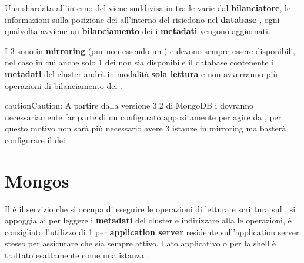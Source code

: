 \documentclass[a4paper,10pt,english]{sphinxmanual}
\begin{document}
Una  shardata all'interno del {\hyperref[cluster_architecture/architecture:cluster]{\emph{}}} viene suddivisa in  tra le
varie {\hyperref[cluster_architecture/architecture:shard]{\emph{}}} dal \textbf{bilanciatore}, le informazioni sulla posizione dei 
all'interno del {\hyperref[cluster_architecture/architecture:cluster]{\emph{}}} risiedono nel \textbf{database} , ogni qualvolta avviene un
\textbf{bilanciamento} dei  i \textbf{metadati} vengono aggiornati.

I 3  sono in \textbf{mirroring} (pur non essendo un {\hyperref[cluster_architecture/architecture:replica-set]{\emph{}}}) e devono
sempre essere disponibili, nel caso in cui anche solo 1 dei  non sia disponibile
il database contenente i \textbf{metadati} del cluster andrà in modalità \textbf{sola lettura} e non
avverranno più operazioni di bilanciamento dei .

\begin{notice}{caution}{Caution:}
A partire dalla versione 3.2 di MongoDB i  dovranno necessariamente far parte
di un {\hyperref[cluster_architecture/architecture:replica-set]{\emph{}}} configurato appositamente per agire da , per questo
motivo non sarà più necessario avere 3 istanze  in mirroring ma basterà configurare
il {\hyperref[cluster_architecture/architecture:replica-set]{\emph{}}} dei .
\end{notice}


\section{Mongos}
\label{cluster_architecture/architecture:id5}\label{cluster_architecture/architecture:mongos}
Il  è il servizio che si occupa di eseguire le operazioni di lettura e scrittura sul
{\hyperref[cluster_architecture/architecture:cluster]{\emph{}}}, si appoggia ai {\hyperref[cluster_architecture/architecture:config-server]{\emph{}}} per leggere i \textbf{metadati} del cluster e
indirizzare alla {\hyperref[cluster_architecture/architecture:shard]{\emph{}}} le operazioni, è consigliato l'utilizzo di 1  per
\textbf{application server} residente sull'application server stesso per assicurare che sia sempre
attivo.
Lato applicativo o per la shell  è trattato esattamente come una istanza .
\end{document}
